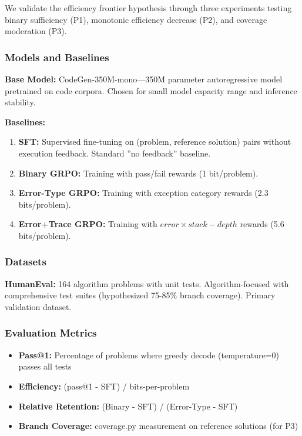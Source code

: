 
We validate the efficiency frontier hypothesis through three experiments testing binary sufficiency (P1), monotonic efficiency decrease (P2), and coverage moderation (P3).

\subsubsection{Models and Baselines}

\textbf{Base Model:} CodeGen-350M-mono---350M parameter autoregressive model pretrained on code corpora. Chosen for small model capacity range and inference stability.

\textbf{Baselines:}
\begin{enumerate}
\item \textbf{SFT:} Supervised fine-tuning on (problem, reference solution) pairs without execution feedback. Standard ''no feedback'' baseline.
\item \textbf{Binary GRPO:} Training with pass/fail rewards (1 bit/problem).
\item \textbf{Error-Type GRPO:} Training with exception category rewards (2.3 bits/problem).
\item \textbf{Error+Trace GRPO:} Training with $error\times stack-depth$ rewards (5.6 bits/problem).
\end{enumerate}

\subsubsection{Datasets}

\textbf{HumanEval:} 164 algorithm problems with unit tests. Algorithm-focused with comprehensive test suites (hypothesized 75-85\% branch coverage). Primary validation dataset.

\subsubsection{Evaluation Metrics}

\begin{itemize}
\item \textbf{Pass@1:} Percentage of problems where greedy decode (temperature=0) passes all tests
\item \textbf{Efficiency:} (pass@1 - SFT) / bits-per-problem
\item \textbf{Relative Retention:} (Binary - SFT) / (Error-Type - SFT)
\item \textbf{Branch Coverage:} coverage.py measurement on reference solutions (for P3)
\end{itemize}


